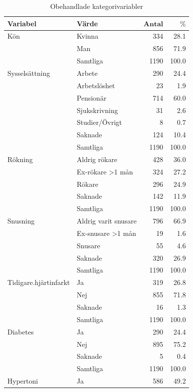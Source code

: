 \begin{table}[htbp]
\centering
\caption{Obehandlade kategorivariabler} 
\label{tab:raw2}
{\footnotesize
\begin{tabular}{ll|rr}
 \textbf{Variabel} & \textbf{Värde} & $\mathbf{Antal}$ & $\mathbf{\%}$ \\ 
  \hline
Kön & Kvinna & 334 & 28.1 \\ 
   & Man & 856 & 71.9 \\ 
   \hline
 & Samtliga & 1190 & 100.0 \\ 
   \hline
\hline
Sysselsättning & Arbete & 290 & 24.4 \\ 
   & Arbetslöshet & 23 & 1.9 \\ 
   & Pensionär & 714 & 60.0 \\ 
   & Sjukskrivning & 31 & 2.6 \\ 
   & Studier/Övrigt & 8 & 0.7 \\ 
   & Saknade & 124 & 10.4 \\ 
   \hline
 & Samtliga & 1190 & 100.0 \\ 
   \hline
\hline
Rökning & Aldrig rökare & 428 & 36.0 \\ 
   & Ex-rökare \textgreater 1 mån & 324 & 27.2 \\ 
   & Rökare & 296 & 24.9 \\ 
   & Saknade & 142 & 11.9 \\ 
   \hline
 & Samtliga & 1190 & 100.0 \\ 
   \hline
\hline
Snusning & Aldrig varit snusare & 796 & 66.9 \\ 
   & Ex-snusare \textgreater 1 mån & 19 & 1.6 \\ 
   & Snusare & 55 & 4.6 \\ 
   & Saknade & 320 & 26.9 \\ 
   \hline
 & Samtliga & 1190 & 100.0 \\ 
   \hline
\hline
Tidigare.hjärtinfarkt & Ja & 319 & 26.8 \\ 
   & Nej & 855 & 71.8 \\ 
   & Saknade & 16 & 1.3 \\ 
   \hline
 & Samtliga & 1190 & 100.0 \\ 
   \hline
\hline
Diabetes & Ja & 290 & 24.4 \\ 
   & Nej & 895 & 75.2 \\ 
   & Saknade & 5 & 0.4 \\ 
   \hline
 & Samtliga & 1190 & 100.0 \\ 
   \hline
\hline
Hypertoni & Ja & 586 & 49.2 \\ 

\end{tabular}}
\end{table}
